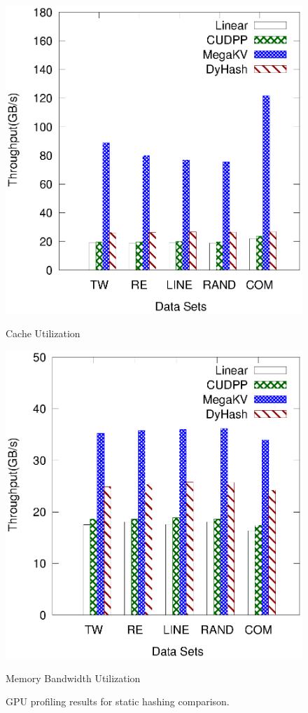 \begin{figure}[ht]
\begin{minipage}{0.3\linewidth}
		\includegraphics[width=\linewidth]{pic/static-profi/L2-read.eps}
		\centerline{Cache Utilization}
	\end{minipage}
	\hfill
	\begin{minipage}{0.3\linewidth}\centering
		\includegraphics[width=\linewidth]{pic/static-profi/memory-read.eps}
		\centerline{Memory Bandwidth Utilization}
	\end{minipage}
	\caption{GPU profiling results for static hashing comparison.}
	\label{fig:static:profile}
\end{figure}


